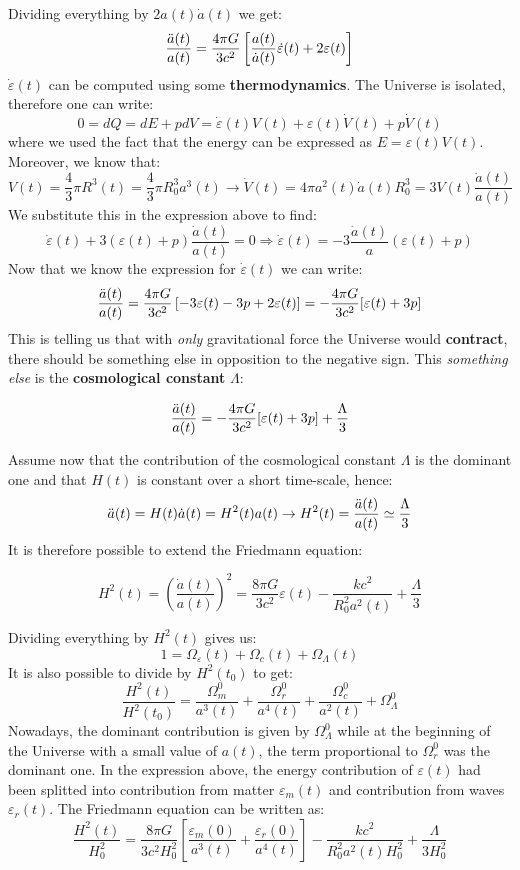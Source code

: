 \documentclass[10.75pt,a4paper,openright,bottom=2cm]{article}
\newcommand{\beginbox}[1]{\begin{tcolorbox}[width=\textwidth,colback={black!40},title={#1},colbacktitle={purple!55},coltitle=black]}
\renewcommand{\endbox}{\end{tcolorbox}\noindent}
\begin{document}
Dividing everything by $2a(t)\Dot{a}(t)$ we get:
\[
\frac{\Ddot{a}(t)}{a(t)}=\frac{4\pi G}{3c^2}\left[\frac{a(t)}{\Dot{a}(t)}\Dot{\varepsilon}(t)+2\varepsilon(t)\right]
\]
$\Dot{\varepsilon}(t)$ can be computed using some \textbf{thermodynamics}. The Universe is isolated, therefore one can write:
\[
0=dQ=dE+pdV=\Dot{\varepsilon}(t)V(t)+\varepsilon(t)\Dot{V}(t)+p\Dot{V}(t)
\]
where we used the fact that the energy can be expressed as $E=\varepsilon(t)V(t)$. Moreover, we know that:
\[
V(t)=\frac{4}{3}\pi R^3(t)=\frac{4}{3}\pi R_0^3a^3(t)\to\Dot{V}(t)=4\pi a^2(t)\Dot{a}(t)R_0^3=3V(t)\frac{\Dot{a}(t)}{a(t)}
\]
We substitute this in the expression above to find:
\[
\Dot{\varepsilon}(t)+3(\varepsilon(t)+p)\frac{\Dot{a}(t)}{a(t)}=0\Rightarrow\Dot{\varepsilon}(t)=-3\frac{\Dot{a}(t)}{a}(\varepsilon(t)+p)
\]
Now that we know the expression for $\Dot{\varepsilon}(t)$ we can write:
\[
\frac{\Ddot{a}(t)}{a(t)}=\frac{4\pi G}{3c^2}\left[-3\varepsilon(t)-3p+2\varepsilon(t)\right]=-\frac{4\pi G}{3c^2}[\varepsilon(t)+3p]
\]
This is telling us that with \textit{only} gravitational force the Universe would \textbf{contract}, there should be something else in opposition to the negative sign. This \textit{something else} is the \textbf{cosmological constant} $\Lambda$:
\beginbox{Cosmological Constant} 
\[
\frac{\Ddot{a}(t)}{a(t)}=-\frac{4\pi G}{3c^2}[\varepsilon(t)+3p]+\frac{\Lambda}{3}
\]
\endbox
Assume now that the contribution of the cosmological constant $\Lambda$ is the dominant one and that $H(t)$ is constant over a short time-scale, hence:
\[
\Ddot{a}(t)=H(t)\Dot{a}(t)=H^2(t)a(t)\to H^2(t)=\frac{\Ddot{a}(t)}{a(t)}\simeq\frac{\Lambda}{3}
\]
It is therefore possible to extend the Friedmann equation:
\beginbox{Full Metal Friedmann Equation}
\[
H^2(t)=\left(\frac{\Dot{a}(t)}{a(t)}\right)^2=\frac{8\pi G}{3c^2}\varepsilon(t)-\frac{kc^2}{R_0^2a^2(t)}+\frac{\Lambda}{3}
\]
\endbox
Dividing everything by $H^2(t)$ gives us:
\[
1=\Omega_\varepsilon(t)+\Omega_c(t)+\Omega_\Lambda(t)
\]
It is also possible to divide by $H^2(t_0)$ to get:
\[
\frac{H^2(t)}{H^2(t_0)}=\frac{\Omega_m^0}{a^3(t)}+\frac{\Omega_r^0}{a^4(t)}+\frac{\Omega_c^0}{a^2(t)}+\Omega_\Lambda^0
\]
Nowadays, the dominant contribution is given by $\Omega_\Lambda^0$ while at the beginning of the Universe with a small value of $a(t)$, the term proportional to $\Omega_r^0$ was the dominant one. In the expression above, the energy contribution of $\varepsilon(t)$ had been splitted into contribution from matter $\varepsilon_m(t)$ and contribution from waves $\varepsilon_r(t)$. The Friedmann equation can be written as:
\[
\frac{H^2(t)}{H_0^2}=\frac{8\pi G}{3c^2H_0^2}\left[\frac{\varepsilon_m(0)}{a^3(t)}+\frac{\varepsilon_r(0)}{a^4(t)}\right]-\frac{kc^2}{R_0^2a^2(t)H_0^2}+\frac{\Lambda}{3H_0^2}
\]
\end{document}
